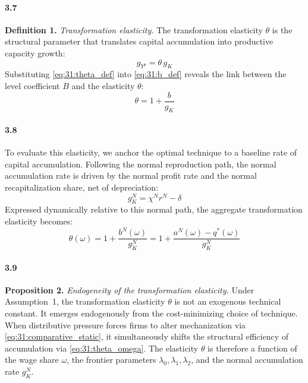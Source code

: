 \paragraph{3.7}
\textbf{Definition 1.} \textit{Transformation elasticity.}
The transformation elasticity $\theta$ is the structural
parameter that translates capital accumulation into productive
capacity growth:
\begin{equation}
	g_{Y^p} = \theta\, g_K
	\label{eq:31:theta_def}
\end{equation}
Substituting \eqref{eq:31:theta_def} into
\eqref{eq:31:b_def} reveals the link between the level
coefficient $B$ and the elasticity $\theta$:
\begin{equation}
	\theta = 1 + \frac{b}{g_K}
	\label{eq:31:theta_link}
\end{equation}

\paragraph{3.8}
To evaluate this elasticity, we anchor the optimal technique
to a baseline rate of capital accumulation. Following the
normal reproduction path, the normal accumulation rate is
driven by the normal profit rate and the normal
recapitalization share, net of depreciation:
\begin{equation}
	g_K^N = \chi^N r^N - \delta
	\label{eq:31:gKN}
\end{equation}
Expressed dynamically relative to this normal path, the
aggregate transformation elasticity becomes:
\begin{equation}
	\theta(\omega) = 1 + \frac{b^N(\omega)}{g_K^N}
	= 1 + \frac{a^N(\omega) - q^*(\omega)}{g_K^N}
	\label{eq:31:theta_omega}
\end{equation}

\paragraph{3.9}
\textbf{Proposition 2.} \textit{Endogeneity of the
	transformation elasticity.} Under Assumption~1, the
transformation elasticity $\theta$ is not an exogenous
technical constant. It emerges endogenously from the
cost-minimizing choice of technique. When distributive
pressure forces firms to alter mechanization via
\eqref{eq:31:comparative_static}, it simultaneously shifts
the structural efficiency of accumulation via
\eqref{eq:31:theta_omega}. The elasticity $\theta$ is
therefore a function of the wage share $\omega$, the frontier
parameters $\lambda_0, \lambda_1, \lambda_2$, and the normal
accumulation rate $g_K^N$.


